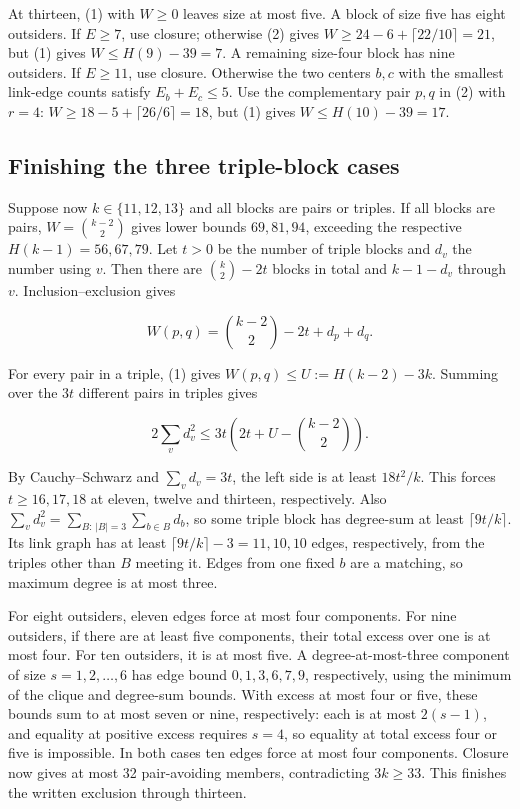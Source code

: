 \documentclass[
  11pt,
]{article}
\begin{document}
At thirteen, (1) with \(W\ge 0\) leaves size at most five. A block of
size five has eight outsiders. If \(E\ge 7\), use closure; otherwise (2)
gives \(W\ge 24-6+\lceil 22/10\rceil=21\), but (1) gives
\(W\le H(9)-39=7\). A remaining size-four block has nine outsiders. If
\(E\ge 11\), use closure. Otherwise the two centers \(b,c\) with the
smallest link-edge counts satisfy \(E_b+E_c\le 5\). Use the
complementary pair \(p,q\) in (2) with \(r=4\):
\(W\ge 18-5+\lceil 26/6\rceil=18\), but (1) gives \(W\le H(10)-39=17\).

\subsection{Finishing the three triple-block
cases}\label{finishing-the-three-triple-block-cases}

Suppose now \(k\in\{11,12,13\}\) and all blocks are pairs or triples. If
all blocks are pairs, \(W=\binom{k-2}{2}\) gives lower bounds
\(69,81,94\), exceeding the respective \(H(k-1)=56,67,79\). Let \(t>0\)
be the number of triple blocks and \(d_v\) the number using \(v\). Then
there are \(\binom k2-2t\) blocks in total and \(k-1-d_v\) through
\(v\). Inclusion--exclusion gives

\[
 W(p,q)=\binom{k-2}{2}-2t+d_p+d_q.
\]

For every pair in a triple, (1) gives \(W(p,q)\le U:=H(k-2)-3k\).
Summing over the \(3t\) different pairs in triples gives

\[
 2\sum_v d_v^2 \le 3t\left(2t+U-\binom{k-2}{2}\right).
\]

By Cauchy--Schwarz and \(\sum_v d_v=3t\), the left side is at least
\(18t^2/k\). This forces \(t\ge 16,17,18\) at eleven, twelve and
thirteen, respectively. Also
\(\sum_v d_v^2=\sum_{B:\,|B|=3}\sum_{b\in B}d_b\), so some triple block
has degree-sum at least \(\lceil 9t/k\rceil\). Its link graph has at
least \(\lceil 9t/k\rceil-3=11,10,10\) edges, respectively, from the
triples other than \(B\) meeting it. Edges from one fixed \(b\) are a
matching, so maximum degree is at most three.

For eight outsiders, eleven edges force at most four components. For
nine outsiders, if there are at least five components, their total
excess over one is at most four. For ten outsiders, it is at most five.
A degree-at-most-three component of size \(s=1,2,\dots,6\) has edge
bound \(0,1,3,6,7,9\), respectively, using the minimum of the clique and
degree-sum bounds. With excess at most four or five, these bounds sum to
at most seven or nine, respectively: each is at most \(2(s-1)\), and
equality at positive excess requires \(s=4\), so equality at total
excess four or five is impossible. In both cases ten edges force at most
four components. Closure now gives at most 32 pair-avoiding members,
contradicting \(3k\ge 33\). This finishes the written exclusion through
thirteen.
\end{document}
